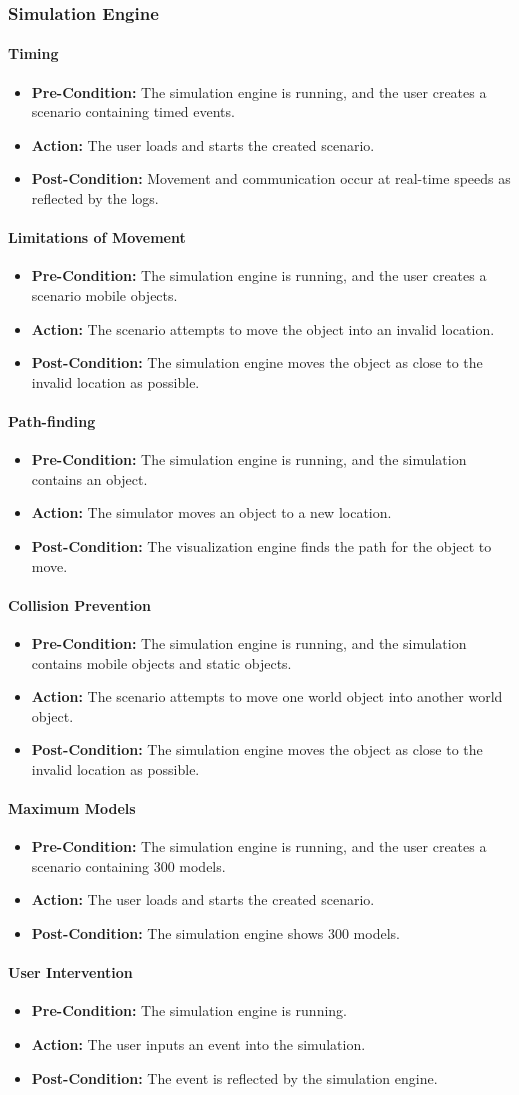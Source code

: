 \documentclass[titlepage]{article}
\newcommand{\testentry}[4]{
    \paragraph{#1}
    \begin{itemize}
        \item \textbf{Pre-Condition:} #2
        \item \textbf{Action:} #3
        \item \textbf{Post-Condition:} #4
    \end{itemize}
}
\begin{document}
\subsubsection{Simulation Engine}
    \testentry{Timing}{
        The simulation engine is running, and the user creates a scenario containing timed events.
    }{
        The user loads and starts the created scenario.
    }{
        Movement and communication occur at real-time speeds as reflected by the logs.
    }
    \testentry{Limitations of Movement}{
        The simulation engine is running, and the user creates a scenario mobile objects.
    }{
        The scenario attempts to move the object into an invalid location.
    }{
        The simulation engine moves the object as close to the invalid location as possible.
    }
    \testentry{Path-finding}{
        The simulation engine is running, and the simulation contains an object.
    }{
        The simulator moves an object to a new location.
    }{
        The visualization engine finds the path for the object to move.
    }
    \testentry{Collision Prevention}{
        The simulation engine is running, and the simulation contains mobile objects and static objects.
    }{
        The scenario attempts to move one world object into another world object.
    }{
        The simulation engine moves the object as close to the invalid location as possible.
    }
    \testentry{Maximum Models}{
        The simulation engine is running, and the user creates a scenario containing 300 models.
    }{
        The user loads and starts the created scenario.
    }{
        The simulation engine shows 300 models.
    }
    \testentry{User Intervention}{
        The simulation engine is running.
    }{
        The user inputs an event into the simulation.
    }{
        The event is reflected by the simulation engine.
    }
\end{document}

